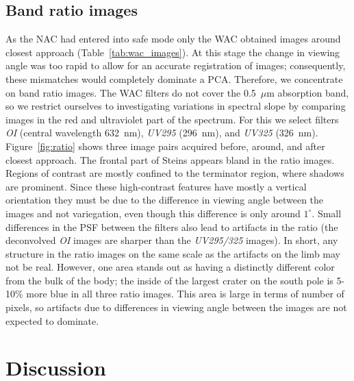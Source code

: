 \documentclass[preprint,3p,authoryear]{elsarticle}
\begin{document}
\subsection{Band ratio images}
\label{sec:band_ratios}

As the NAC had entered into safe mode only the WAC obtained images around closest approach (Table~\ref{tab:wac_images}). At this stage the change in viewing angle was too rapid to allow for an accurate registration of images; consequently, these mismatches would completely dominate a PCA. Therefore, we concentrate on band ratio images. The WAC filters do not cover the 0.5~$\mu$m absorption band, so we restrict ourselves to investigating variations in spectral slope by comparing images in the red and ultraviolet part of the spectrum. For this we select filters {\it OI} (central wavelength 632~nm), {\it UV295} (296~nm), and {\it UV325} (326~nm). Figure~\ref{fig:ratio} shows three image pairs acquired before, around, and after closest approach. The frontal part of Steins appears bland in the ratio images. Regions of contrast are mostly confined to the terminator region, where shadows are prominent. Since these high-contrast features have mostly a vertical orientation they must be due to the difference in viewing angle between the images and not variegation, even though this difference is only around $1^\circ$. Small differences in the PSF between the filters also lead to artifacts in the ratio (the deconvolved {\it OI} images are sharper than the {\it UV295/325} images). In short, any structure in the ratio images on the same scale as the artifacts on the limb may not be real. However, one area stands out as having a distinctly different color from the bulk of the body; the inside of the largest crater on the south pole is 5-10\% more blue in all three ratio images. This area is large in terms of number of pixels, so artifacts due to differences in viewing angle between the images are not expected to dominate.


\section{Discussion}
\label{sec:discussion}
\end{document}
